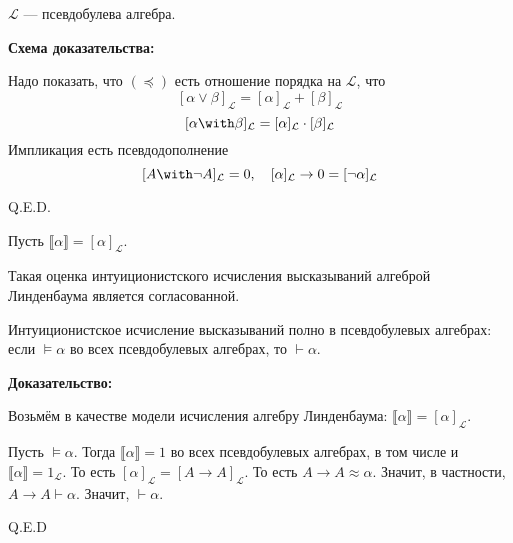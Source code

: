 $\mathcal{L}$ --- псевдобулева алгебра.

\textbf{Схема доказательства:}

 Надо показать, что $(\preceq)$ есть отношение порядка на $\mathcal{L}$, что
$$[\alpha\vee\beta]_\mathcal{L} = [\alpha]_\mathcal{L}+[\beta]_\mathcal{L}$$
$$[\alpha\with\beta]_\mathcal{L} = [\alpha]_\mathcal{L}\cdot[\beta]_\mathcal{L}$$ Импликация есть псевдодополнение
$$[A\with\neg A]_\mathcal{L} = 0, \quad [\alpha]_\mathcal{L}\rightarrow 0 = [\neg\alpha]_\mathcal{L}$$

\hfill Q.E.D.



Пусть $\llbracket\alpha\rrbracket = [\alpha]_\mathcal{L}$.

Такая оценка интуиционистского исчисления высказываний алгеброй Линденбаума является согласованной.



Интуиционистское исчисление высказываний полно в псевдобулевых алгебрах:
если $\models\alpha$ во всех псевдобулевых алгебрах, то $\vdash\alpha$. 

\textbf{Доказательство:}

Возьмём в качестве модели исчисления алгебру Линденбаума: 
$\llbracket \alpha \rrbracket = [\alpha]_\mathcal{L}$. 

Пусть $\models\alpha$. Тогда $\llbracket\alpha\rrbracket = 1$ во всех псевдобулевых алгебрах, в том числе
и $\llbracket\alpha\rrbracket = 1_\mathcal{L}$. То есть $[\alpha]_\mathcal{L} = [A\rightarrow A]_\mathcal{L}$.
То есть $A \rightarrow A \approx \alpha$. Значит, в частности, $A \rightarrow A \vdash \alpha$. 
Значит, $\vdash\alpha$.

\hfill Q.E.D

